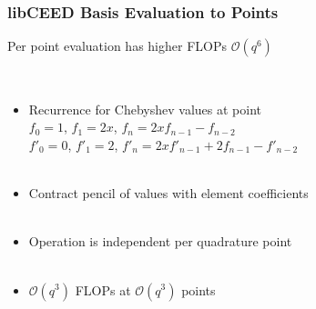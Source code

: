 \documentclass{beamer}
\begin{document}
\begin{frame}
\begin{center}
\frametitle{libCEED Basis Evaluation to Points}

Per point evaluation has higher FLOPs $\mathcal{O} \left( q^6 \right)$

~\\

\begin{itemize}

\item Recurrence for Chebyshev values at point\\

$f_0 = 1$, $f_1 = 2 x$, $f_n = 2 x f_{n - 1} - f_{n - 2}$\\

$f'_0 = 0$, $f'_1 = 2$, \hspace{0.7mm} $f'_n = 2 x f'_{n - 1} + 2 f_{n - 1} - f'_{n - 2}$\\

~\\

\item Contract pencil of values with element coefficients\\

~\\

\item Operation is independent per quadrature point\\

~\\

\item $\mathcal{O} \left( q^3 \right)$ FLOPs at $\mathcal{O} \left( q^3 \right)$ points\\

\end{itemize}

\end{center}
\end{frame}

\end{document}
